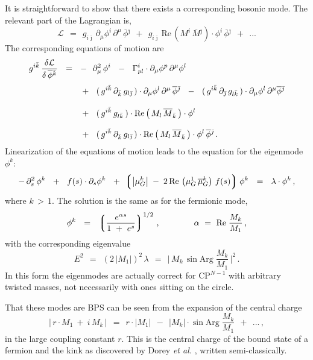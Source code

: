 \documentclass[epsfig,12pt]{article}
\def\beq{\begin{equation}}
\def\eeq{\end{equation}}
\def\beq{\begin{equation}}
\def\eeq{\end{equation}}
\newcommand{\p}{\partial}
\newcommand{\ov}{\overline}
\newcommand{\mc}[1]{\mathcal{#1}}
\newcommand{\lgr}{\left\lgroup}
\newcommand{\rgr}{\right\rgroup}
\newcommand{\bphi}{\ov{\phi}{}}
\newcommand{\bj}{{\bar \jmath}}
\newcommand{\bk}{{\bar k}}
\begin{document}
	It is straightforward to show that there exists a corresponding bosonic mode. 
	The relevant part of the Lagrangian is,
\beq
	\mc{L} ~~=~~ g_{i\bj}\, \p_\mu \phi^i\, \p^\mu\, \bphi{}^\bj 
	       ~~+~~ g_{i\bj}\, \text{Re}\, ( M^i\, \ov{M}{}^\bj ) \cdot \phi^i\, \bphi^\bj ~~+~~ ...
\eeq
	The corresponding equations of motion are
\begin{align}
%
\notag
	g^{i\bk}\, \frac{\delta \mc{L}}
                        {\delta\, \bphi{}^\bk} 
	& ~~=~~
	-~~ \p_\mu^2\, \phi^i 
	~~-~~ \Gamma^i_{pl} \cdot \p_\mu \phi^p\, \p^\mu \phi^l
	\\[1mm]
%
	&~~~~~~
	~~+~~
	(\, g^{i\bk}\, \p_{\bk}\, g_{l\bj} \,) \cdot \p_\mu \phi^l\, \p^\mu\, \bphi{}^\bj 
	~~-~~ (\, g^{i\bk}\, \p_\bj\, g_{l\bk} \,) \cdot \p_\mu \phi^l\, \p^\mu \bphi{}^\bj 
	\\[3mm]
%
\notag
	&~~~~~~
	~~+~~ (\, g^{i\bk}\, g_{l\bk} \,) \cdot \text{Re} \left(\, M_l\, \ov{M}{}_{\bk} \,\right) \cdot \phi^l
	\\[2.5mm]
%
\notag
	&~~~~~~
	~~+~~ (\, g^{i\bk}\, \p_\bk\, g_{l\bj} \,) \cdot 
		\text{Re} \left(\, M_l\, \ov{M}{}_{\bk} \,\right) \cdot \phi^l\, \bphi{}^\bj\,.
\end{align}
	Linearization of the equations of motion leads to the equation for the eigenmode $ \phi^k $:
\beq
	-\, \p_s^2\, \phi^k  ~~+~~ f(s) \cdot \p_s \phi^k ~~+~~ \!\! 
	\lgr \left| \mu_G^k \right| \;-\; 2\, \text{Re}\, \left( \mu_G^1\, \ov{\mu}{}_G^k \right)\, f(s) \rgr \phi^k 
	~~=~~ \lambda \cdot \phi^k\,,
\eeq
	where $ k \,>\, 1 $.
	The solution is the same as for the fermionic mode,
\beq
	\phi^k  ~~=~~  \lgr \frac{  e^{\alpha s}  }
	                         {   1 ~+~ e^s    }  \rgr^{ 1/2 }\,,
	\qquad\qquad
	\alpha ~=~ \text{Re}\; \frac{M_k}{M_1}\,,
\eeq
	with the corresponding eigenvalue
\beq
\label{E}
	E^2 ~~=~~ \left( 2\, | M_1 | \right)^2\, \lambda ~~=~~ \Big|\, M_k\, \sin \text{Arg}\; \frac{ M_k }{ M_1 } \,\Big|^2\,.
\eeq
	In this form the eigenmodes are actually correct for CP$^{N-1}$ with arbitrary twisted masses,
	not necessarily with ones sitting on the circle.

	That these modes are BPS can be seen from the expansion of the central charge
\beq
\label{asympt}
       |\, r \cdot M_1  ~+~ i\, M_k \,|  ~~=~~ r \cdot | M_1 |  ~~-~~ | M_k | \cdot \sin \text{Arg}\; \frac { M_k } 
                                                                                                            { M_1 }  
                                                                ~~+~~ ... \,,
\eeq
	in the large coupling constant $ r $.
	This is the central charge of the bound state of a fermion and the kink 
	as discovered by Dorey {\it et al.} \cite{Dorey:1999zk}, written semi-classically.
\end{document}
